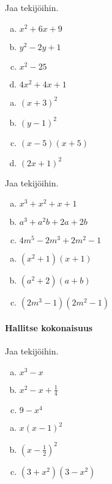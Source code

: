 \begin{tehtava}
    Jaa tekijöihin.
    \begin{enumerate}[a)]
        \item $x^2+6x+9$
        \item $y^2 - 2y+1$
        \item $x^2 -25$
        \item $4x^2 +4x +1$
    \end{enumerate}
    \begin{vastaus}
        \begin{enumerate}[a)]
        \item $(x+3)^2$
        \item $(y-1)^2$
        \item $(x-5)(x+5)$
        \item $(2x+1)^2$
        \end{enumerate}
    \end{vastaus}
\end{tehtava}

\begin{tehtava}
    Jaa tekijöihin.
    \begin{enumerate}[a)]
        \item $x^3 +x^2 +x +1$
        \item $a^3 +a^2b +2a +2b$
        \item $4m^5 -2m^3 +2m^2 -1$
    \end{enumerate}
    \begin{vastaus}
        \begin{enumerate}[a)]
        \item $(x^2+1)(x+1)$
        \item $(a^2+2)(a+b)$
        \item $(2m^3 -1)(2m^2 -1)$
        \end{enumerate}
    \end{vastaus}
\end{tehtava}

\paragraph*{Hallitse kokonaisuus}

\begin{tehtava}
    Jaa tekijöihin.
    \begin{enumerate}[a)]
    	\item $x^3 - x$
        \item $x^2 - x + \frac{1}{4} $
        \item $9-x^4$
    \end{enumerate}
    \begin{vastaus}
        \begin{enumerate}[a)]
            \item $x(x-1)^2$
            \item $(x-\frac{1}{2})^2$
            \item $(3+x^2)(3-x^2)$
        \end{enumerate}
    \end{vastaus}
\end{tehtava}
